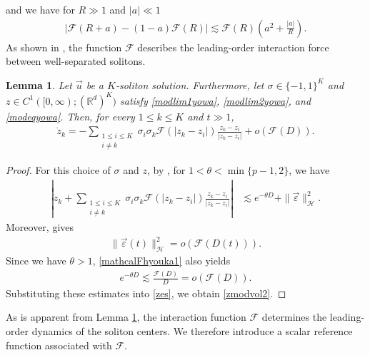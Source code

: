 \documentclass[reqno]{amsart}
\theoremstyle{plain}
\newtheorem{lemma}[theorem]{Lemma}
\theoremstyle{definition}
\numberwithin{equation}{section}
\begin{document}
and we have for $R\gg1$ and $|a|\ll 1$
\begin{align}\label{tukaeruF2}
\left|\mathcal{F}(R+a)-(1-a)\mathcal{F}(R)\right|\lesssim \mathcal{F}(R)\left(a^2+\frac{|a|}{R}\right).
\end{align}
As shown in \cite[Section 3]{I2}, the function $\mathcal{F}$ describes the leading-order interaction force between
well-separated solitons.
\begin{lemma}\label{centerdynamics}
Let $\vec{u}$ be a $K$-soliton solution. Furthermore, let $\sigma\in\{-1,1\}^K$ and $z\in C^1([0,\infty);(\mathbb{R}^d)^K)$ satisfy \eqref{modlim1yowa}, \eqref{modlim2yowa}, and \eqref{modeqyowa}. Then, for every $1\leq k\leq K$ and $t\gg1$,
\begin{align}\label{zmodvol2}
\dot{z}_k
=-\sum_{\substack{1\leq i\leq K\\ i\neq k}}\sigma_i\sigma_k\mathcal{F}(|z_k-z_i|)
\frac{z_k-z_i}{|z_k-z_i|}
+o(\mathcal{F}(D)).
\end{align}
\end{lemma}
\begin{proof}
For this choice of $\sigma$ and $z$, by \cite[Lemma 3.3]{I2}, for $1<\theta<\min\{p-1,2\}$, we have
\begin{align}
\left|\dot{z}_k+\sum_{\substack{1\leq i\leq K\\ i\neq k}}\sigma_i\sigma_k\mathcal{F}(|z_k-z_i|)
\frac{z_k-z_i}{|z_k-z_i|}\right|
&\lesssim e^{-\theta D}+\|\vec{\varepsilon}\|_{\mathcal{H}}^2.\label{zes}
\end{align}
Moreover, \cite[Lemma 3.8]{I2} gives
\begin{align*}
\|\vec{\varepsilon}(t)\|_{\mathcal H}^2=o(\mathcal F(D(t))).
\end{align*}
Since we have $\theta>1$, \eqref{mathcalFhyouka1} also yields
\begin{align*}
e^{-\theta D}\lesssim \frac{\mathcal F(D)}{D}=o(\mathcal F(D)).
\end{align*}
Substituting these estimates into \eqref{zes}, we obtain \eqref{zmodvol2}.
\end{proof}

As is apparent from Lemma \ref{centerdynamics}, the interaction
function $\mathcal{F}$ determines the leading-order dynamics of the
soliton centers. We therefore introduce a scalar reference function
associated with $\mathcal{F}$.
\end{document}
